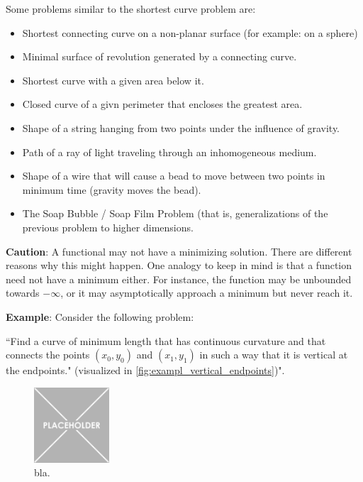 \bigbreak

Some problems similar to the shortest curve problem are:
\begin{itemize}
    \item Shortest connecting curve on a non-planar surface (for example: on a sphere)

    \item Minimal surface of revolution generated by a connecting curve. 
    
    \item Shortest curve with a given area below it. 
    
    \item Closed curve of a givn perimeter that encloses the greatest area. 
    
    \item Shape of a string hanging from two points under the influence of gravity. 
    
    \item Path of a ray of light traveling through an inhomogeneous medium. 
    
    \item Shape of a wire that will cause a bead to move between two points in minimum time (gravity moves the bead). 
    
    \item The Soap Bubble / Soap Film Problem (that is, generalizations of the previous problem to higher dimensions. 
\end{itemize}

\bigbreak
\noindent \textbf{Caution}:
A functional may not have a minimizing solution. 
There are different reasons why this might happen. 
One analogy to keep in mind is that a function need not have a minimum either.
For instance, the function may be unbounded towards $-\infty$, or it may asymptotically approach a minimum but never reach it. 

\bigbreak
\noindent \textbf{Example}:
Consider the following problem:

``Find a curve of minimum length that has continuous curvature and that connects the points $(x_0, y_0)$ and $(x_1, y_1)$ in such a way that it is vertical at the endpoints." (visualized in \autoref{fig:exampl_vertical_endpoints})".

\begin{figure}
    \centering
    \includegraphics[width=0.25\textwidth]{figures/placeholder.png}
    \caption{bla.}
    \label{fig:exampl_vertical_endpoints}
\end{figure}

